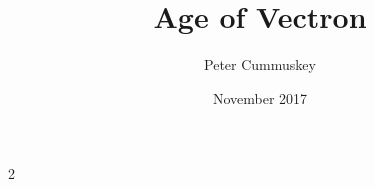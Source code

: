 \documentclass[10pt,twoside,openany]{book}
\title{Age of Vectron}
\author{Peter Cummuskey}
\date{November 2017}
\begin{document}
\begin{multicols}{2}

\end{multicols}{2}
\end{document}
